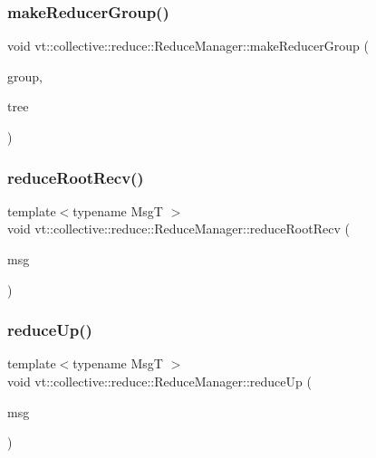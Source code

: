 \subsubsection{\texorpdfstring{make\+Reducer\+Group()}{makeReducerGroup()}}
{\footnotesize\ttfamily void vt\+::collective\+::reduce\+::\+Reduce\+Manager\+::make\+Reducer\+Group (\begin{DoxyParamCaption}\item[{\hyperlink{namespacevt_a27b5e4411c9b6140c49100e050e2f743}{Group\+Type} const \&}]{group,  }\item[{\hyperlink{structvt_1_1collective_1_1tree_1_1_tree}{collective\+::tree\+::\+Tree} $\ast$}]{tree }\end{DoxyParamCaption})}

\mbox{\label{structvt_1_1collective_1_1reduce_1_1_reduce_manager_a7ee21e635c585acc7d7339911a0900eb}} 
\subsubsection{\texorpdfstring{reduce\+Root\+Recv()}{reduceRootRecv()}}
{\footnotesize\ttfamily template$<$typename MsgT $>$ \\
void vt\+::collective\+::reduce\+::\+Reduce\+Manager\+::reduce\+Root\+Recv (\begin{DoxyParamCaption}\item[{MsgT $\ast$}]{msg }\end{DoxyParamCaption})\hspace{0.3cm}{\ttfamily [static]}}

\mbox{\label{structvt_1_1collective_1_1reduce_1_1_reduce_manager_a744a70b8e28ef9c58cb9ccdb06493d15}} 
\subsubsection{\texorpdfstring{reduce\+Up()}{reduceUp()}}
{\footnotesize\ttfamily template$<$typename MsgT $>$ \\
void vt\+::collective\+::reduce\+::\+Reduce\+Manager\+::reduce\+Up (\begin{DoxyParamCaption}\item[{MsgT $\ast$}]{msg }\end{DoxyParamCaption})\hspace{0.3cm}{\ttfamily [static]}}




